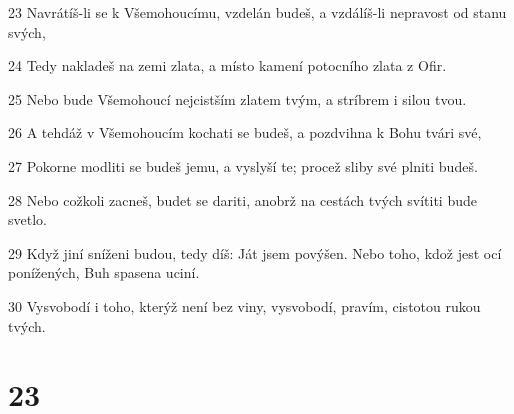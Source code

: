\par 23 Navrátíš-li se k Všemohoucímu, vzdelán budeš, a vzdálíš-li nepravost od stanu svých,
\par 24 Tedy nakladeš na zemi zlata, a místo kamení potocního zlata z Ofir.
\par 25 Nebo bude Všemohoucí nejcistším zlatem tvým, a stríbrem i silou tvou.
\par 26 A tehdáž v Všemohoucím kochati se budeš, a pozdvihna k Bohu tvári své,
\par 27 Pokorne modliti se budeš jemu, a vyslyší te; procež sliby své plniti budeš.
\par 28 Nebo cožkoli zacneš, budet se dariti, anobrž na cestách tvých svítiti bude svetlo.
\par 29 Když jiní sníženi budou, tedy díš: Ját jsem povýšen. Nebo toho, kdož jest ocí ponížených, Buh spasena uciní.
\par 30 Vysvobodí i toho, kterýž není bez viny, vysvobodí, pravím, cistotou rukou tvých.

\chapter{23}

